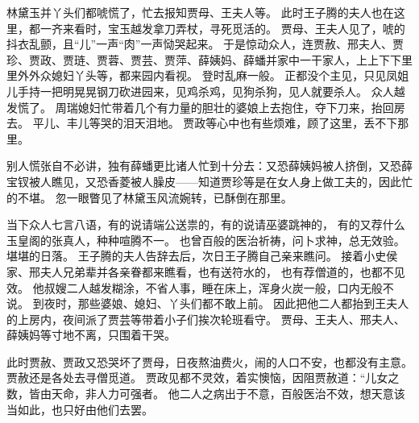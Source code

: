 林黛玉并丫头们都唬慌了，忙去报知贾母、王夫人等。
此时王子腾的夫人也在这里，都一齐来看时，宝玉越发拿刀弄杖，寻死觅活的。
贾母、王夫人见了，唬的抖衣乱颤，且“儿”一声“肉”一声恸哭起来。
于是惊动众人，连贾赦、邢夫人、贾珍、贾政、贾琏、贾蓉、贾芸、贾萍、薛姨妈、薛蟠并家中一干家人，上上下下里里外外众媳妇丫头等，都来园内看视。
登时乱麻一般。
正都没个主见，只见凤姐儿手持一把明晃晃钢刀砍进园来，见鸡杀鸡，见狗杀狗，见人就要杀人。
众人越发慌了。
周瑞媳妇忙带着几个有力量的胆壮的婆娘上去抱住，夺下刀来，抬回房去。
平儿、丰儿等哭的泪天泪地。
贾政等心中也有些烦难，顾了这里，丢不下那里。
\par
别人慌张自不必讲，独有薛蟠更比诸人忙到十分去：又恐薛姨妈被人挤倒，又恐薛宝钗被人瞧见，又恐香菱被人臊皮——知道贾珍等是在女人身上做工夫的，因此忙的不堪。
忽一眼瞥见了林黛玉风流婉转，已酥倒在那里。
\par
当下众人七言八语，有的说请端公送祟的，有的说请巫婆跳神的，
有的又荐什么玉皇阁的张真人，种种喧腾不一。
也曾百般的医治祈祷，问卜求神，总无效验。
堪堪的日落。
王子腾的夫人告辞去后，次日王子腾自己亲来瞧问。
接着小史侯家、邢夫人兄弟辈并各亲眷都来瞧看，也有送符水的，
也有荐僧道的，也都不见效。
他叔嫂二人越发糊涂，不省人事，睡在床上，浑身火炭一般，口内无般不说。
到夜时，那些婆娘、媳妇、丫头们都不敢上前。
因此把他二人都抬到王夫人的上房内，夜间派了贾芸等带着小子们挨次轮班看守。
贾母、王夫人、邢夫人、薛姨妈等寸地不离，只围着干哭。
\par
此时贾赦、贾政又恐哭坏了贾母，日夜熬油费火，闹的人口不安，也都没有主意。
贾赦还是各处去寻僧觅道。
贾政见都不灵效，着实懊恼，因阻贾赦道：“儿女之数，皆由天命，非人力可强者。
他二人之病出于不意，百般医治不效，想天意该当如此，也只好由他们去罢。
